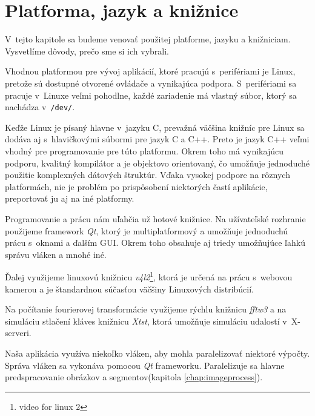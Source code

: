 \chapter{Platforma, jazyk a knižnice}

V~tejto kapitole sa budeme venovať použitej platforme, jazyku a knižniciam. Vysvetlíme dôvody, prečo sme si ich vybrali.
\bigskip

Vhodnou platformou pre vývoj aplikácií, ktoré pracujú s~perifériami je Linux, pretože sú dostupné otvorené ovládače a vynikajúca podpora. S~perifériami sa pracuje v~Linuxe veľmi pohodlne, každé zariadenie má vlastný súbor, ktorý sa nachádza v~{\tt /dev/}.

Keďže Linux je písaný hlavne v~jazyku C, prevažná väčšina knižníc pre Linux sa dodáva aj s~hlavičkovými súbormi pre jazyk C a C++.
Preto je jazyk C++ veľmi vhodný pre programovanie pre túto platformu. Okrem toho má vynikajúcu podporu, kvalitný kompilátor a je objektovo orientovaný, čo umožňuje jednoduché použitie komplexných dátových štruktúr. Vďaka vysokej podpore na rôznych platformách, nie je problém po prispôsobení niektorých častí aplikácie, preportovať ju aj na iné platformy.

Programovanie a prácu nám uľahčia už hotové knižnice. Na užívateľské rozhranie použijeme framework \textit{Qt}, ktorý je multiplatformový a umožňuje jednoduchú prácu s~oknami a ďalším GUI. Okrem toho obsahuje aj triedy umožňujúce ľahkú správu vláken a mnohé iné.

Ďalej využijeme linuxovú knižnicu \textit{v4l2}\footnote{video for linux 2}, ktorá je určená na prácu s~webovou kamerou a je štandardnou súčasťou väčšiny Linuxových distribúcií.

Na počítanie fourierovej transformácie využijeme rýchlu knižnicu \textit{fftw3} a na simuláciu stlačení kláves knižnicu \textit{Xtst}, ktorá umožňuje simuláciu udalostí v~X-serveri.

Naša aplikácia využíva niekoľko vláken, aby mohla paralelizovať niektoré výpočty. Správa vláken sa vykonáva pomocou \textit{Qt} frameworku. Paralelizuje sa hlavne predspracovanie obrázkov a segmentov(kapitola \ref{chap:imageprocess}).


